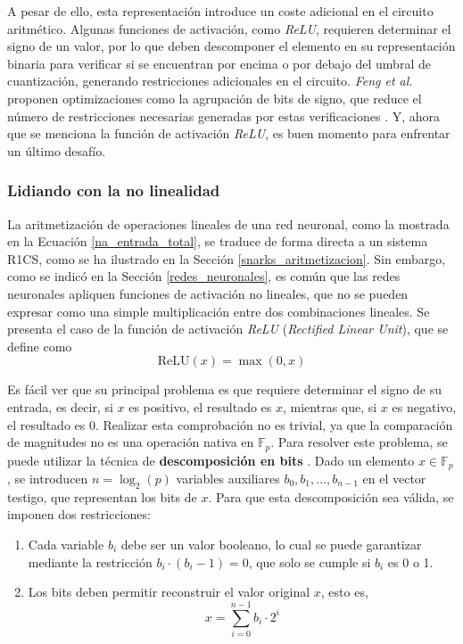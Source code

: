 \documentclass[a4paper, 11pt]{article}
\begin{document}
A pesar de ello, esta representación introduce un coste adicional en el circuito aritmético. Algunas
funciones de activación, como \textit{ReLU}, requieren determinar el signo de un valor, por lo que
deben descomponer el elemento en su representación binaria para verificar si se encuentran por encima
o por debajo del umbral de cuantización, generando restricciones adicionales en el circuito.
\textit{Feng et al.} proponen optimizaciones como la agrupación de bits de signo, que reduce el
número de restricciones necesarias generadas por estas verificaciones \cite{feng2021zen}. Y, ahora
que se menciona la función de activación \textit{ReLU}, es buen momento para enfrentar un último
desafío.

\subsubsection{Lidiando con la no linealidad} \label{lidiando_no_linealidad}

La aritmetización de operaciones lineales de una red neuronal, como la mostrada en la Ecuación
\ref{na_entrada_total}, se traduce de forma directa a un sistema R1CS, como se ha ilustrado en la
Sección \ref{snarks_aritmetizacion}. Sin embargo, como se indicó en la Sección \ref{redes_neuronales},
es común que las redes neuronales apliquen funciones de activación no lineales, que no se pueden
expresar como una simple multiplicación entre dos combinaciones lineales. Se presenta el caso de la
función de activación \textit{ReLU} (\textit{Rectified Linear Unit}), que se define como
\begin{equation}
  \text{ReLU}(x) = \max(0, x) \label{relu}
\end{equation}

Es fácil ver que su principal problema es que requiere determinar el signo de su entrada, es decir,
si $x$ es positivo, el resultado es $x$, mientras que, si $x$ es negativo, el resultado es 0. Realizar
esta comprobación no es trivial, ya que la comparación de magnitudes no es una operación nativa en
$\mathbb{F}_p$. Para resolver este problema, se puede utilizar la técnica de \textbf{descomposición en bits}
\cite[Capítulo~6]{thaler2022proofs}. Dado un elemento $x \in \mathbb{F}_p$, se introducen $n = \log_2(p)$
variables auxiliares $b_0, b_1, \ldots, b_{n-1}$ en el vector testigo, que representan los bits de
$x$. Para que esta descomposición sea válida, se imponen dos restricciones:
\begin{enumerate}
  \item Cada variable $b_i$ debe ser un valor booleano, lo cual se puede garantizar mediante la
        restricción $b_i \cdot (b_i - 1) = 0$, que solo se cumple si $b_i$ es 0 o 1.
  \item Los bits deben permitir reconstruir el valor original $x$, esto es,
        \begin{equation}
          x = \sum_{i=0}^{n-1} b_i \cdot 2^i \label{descomposicion_bits}
        \end{equation}
\end{enumerate}
\end{document}
